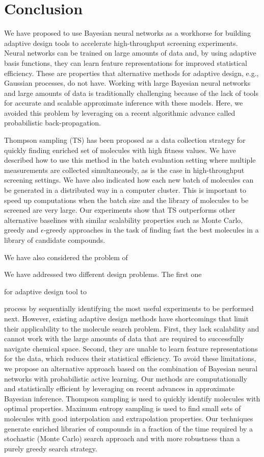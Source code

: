 \section{Conclusion}

We have proposed to use Bayesian neural networks as a workhorse for building adaptive design tools to accelerate high-throughput screening experiments. Neural networks can be trained on large amounts of data and, by using adaptive basis functions, they can learn feature representations for improved statistical efficiency. These are properties that alternative methods for adaptive design, e.g., Gaussian processes, do not have. Working with large Bayesian neural networks and large amounts of data is traditionally challenging because of the lack of tools for accurate and scalable approximate inference with these models. Here, we avoided this problem by leveraging on a recent algorithmic advance called probabilistic back-propagation.

Thompson sampling (TS) has been proposed as a data collection strategy for quickly finding enriched set of molecules with high fitness values. We have described how to use this method in the batch evaluation setting where multiple measurements are collected simultaneously, as is the case in high-throughput screening settings. We have also indicated how each new batch of molecules can be generated in a distributed way in a computer cluster. This is important to speed up computations when the batch size and the library of molecules to be screened are very large. Our experiments show that TS outperforms other alternative baselines with similar scalability properties such as Monte Carlo, greedy and $\epsilon$-greedy approaches in the task of finding fast the best molecules in a library of candidate compounds.

We have also considered the problem of 

We have addressed two different design problems. The first one

for adaptive design tool to


process by sequentially identifying the most useful experiments to be performed
next. However, existing adaptive design methods have shortcomings that limit
their applicability to the molecule search problem. First, they lack
scalability and cannot work with the large amounts of data that are required to
successfully navigate chemical space. Second, they are unable to learn feature
representations for the data, which reduces their statistical efficiency. To
avoid these limitations, we propose an alternative approach based on the
combination of Bayesian neural networks with probabilistic active learning. Our
methods are computationally and statistically efficient by leveraging on recent
advances in approximate Bayesian inference. Thompson
sampling is used to quickly identify molecules with optimal properties.
Maximum entropy sampling is used
to find small sets of molecules with good interpolation and extrapolation properties.
Our techniques generate enriched libraries of compounds in a fraction
of the time required by a stochastic (Monte Carlo) search approach and with
more robustness than a purely greedy search strategy.

